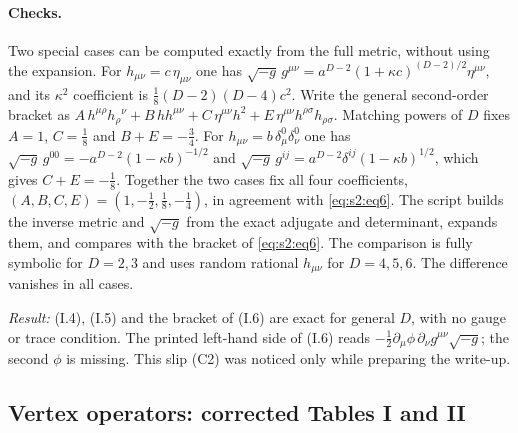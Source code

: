 \documentclass[aps,prd,onecolumn,10pt,nofootinbib,floatfix]{revtex4-2}
\newcommand{\eqI}[1]{(I.#1)}
\begin{document}
\paragraph*{Checks.}
Two special cases can be computed exactly from the full metric, without
using the expansion. For $h_{\mu\nu}=c\,\eta_{\mu\nu}$ one has
$\sqrt{-g}\,g^{\mu\nu}=a^{D-2}(1+\kappa c)^{(D-2)/2}\eta^{\mu\nu}$, and its
$\kappa^2$ coefficient is $\tfrac18(D-2)(D-4)c^2$. Write the general
second-order bracket as
$A\,h^{\mu\rho}h_\rho{}^\nu+B\,hh^{\mu\nu}+C\,\eta^{\mu\nu}h^2+E\,\eta^{\mu\nu}h^{\rho\sigma}h_{\rho\sigma}$.
Matching powers of $D$ fixes $A=1$, $C=\tfrac18$ and $B+E=-\tfrac34$. For
$h_{\mu\nu}=b\,\delta^0_\mu\delta^0_\nu$ one has
$\sqrt{-g}\,g^{00}=-a^{D-2}(1-\kappa b)^{-1/2}$ and
$\sqrt{-g}\,g^{ij}=a^{D-2}\delta^{ij}(1-\kappa b)^{1/2}$, which gives
$C+E=-\tfrac18$. Together the two cases fix all four coefficients,
$(A,B,C,E)=(1,-\tfrac12,\tfrac18,-\tfrac14)$, in agreement with
\eqref{eq:s2:eq6}. The script 
builds the inverse metric and $\sqrt{-g}$ from the exact adjugate and
determinant, expands them, and compares with the bracket of
\eqref{eq:s2:eq6}. The comparison is fully symbolic for $D=2,3$ and uses
random rational $h_{\mu\nu}$ for $D=4,5,6$. The difference vanishes in all
cases.

\emph{Result:} \eqI{4}, \eqI{5} and the bracket of \eqI{6} are exact for
general $D$, with no gauge or trace condition. The printed left-hand side of
\eqI{6} reads $-\tfrac12\partial_\mu\phi\,\partial_\nu g^{\mu\nu}\sqrt{-g}$;
the second $\phi$ is missing. This slip (C2) was noticed only while
preparing the write-up.

\subsection{Vertex operators: corrected Tables I and II}
\label{sec:s2:vertices}
\end{document}
